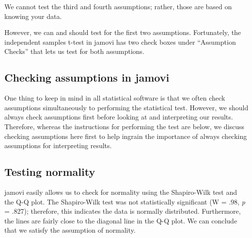 \documentclass[
]{book}
\begin{document}
We cannot test the third and fourth assumptions; rather, those are based on knowing your data.

However, we can and should test for the first two assumptions. Fortunately, the independent samples t-test in jamovi has two check boxes under ``Assumption Checks'' that lets us test for both assumptions.

\hypertarget{checking-assumptions-in-jamovi}{%
\subsection{Checking assumptions in jamovi}\label{checking-assumptions-in-jamovi}}

One thing to keep in mind in all statistical software is that we often check assumptions simultaneously to performing the statistical test. However, we should always check assumptions first before looking at and interpreting our results. Therefore, whereas the instructions for performing the test are below, we discuss checking assumptions here first to help ingrain the importance of always checking assumptions for interpreting results.

\hypertarget{testing-normality}{%
\subsection{Testing normality}\label{testing-normality}}

jamovi easily allows us to check for normality using the Shapiro-Wilk test and the Q-Q plot. The Shapiro-Wilk test was not statistically significant (W = .98, \emph{p} = .827); therefore, this indicates the data is normally distributed. Furthermore, the lines are fairly close to the diagonal line in the Q-Q plot. We can conclude that we satisfy the assumption of normality.
\end{document}
